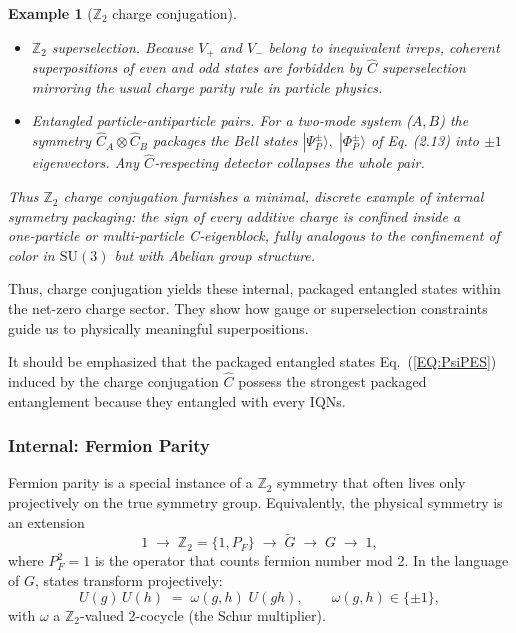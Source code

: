 \documentclass[12pt,a4paper]{article}
\newtheorem{example}{Example}
\begin{document}
\begin{example}[$\mathbb Z_{2}$ charge conjugation]
\begin{enumerate}
\begin{itemize}
			\item $\mathbb Z_{2}$ superselection.
			Because $V_{+}$ and $V_{-}$ belong to inequivalent irreps,
			coherent superpositions of even and odd states are forbidden by
			$\hat C$ superselection mirroring the usual charge parity rule in particle physics.
			
			\item Entangled particle-antiparticle pairs.
			For a two‑mode system ($A,B$) the symmetry
			$\hat C_A\otimes\hat C_B$ packages the Bell states
			$
			|\Psi_P^\pm\rangle,\;
			|\Phi_P^\pm\rangle
			$
			of Eq. (2.13) into $\pm1$ eigenvectors.
			Any $\hat C$‑respecting	detector collapses the whole pair.
		\end{itemize}
	\end{enumerate}
	
	
	Thus $\mathbb Z_{2}$ charge conjugation furnishes a minimal, discrete example	of internal symmetry packaging: the sign of every additive charge is confined inside a one‑particle or multi‑particle C‑eigenblock, fully analogous to the confinement of color in $\mathrm{SU}(3)$ but with Abelian group structure.
\end{example}



Thus, charge conjugation yields these internal, packaged entangled states within the net-zero charge sector.
They show how gauge or superselection constraints guide us to physically meaningful superpositions.


It should be emphasized that the packaged entangled states Eq.~(\ref{EQ:PsiPES}) induced by the charge conjugation $\hat{C}$ possess the strongest packaged entanglement because they entangled with every IQNs.



\subsubsection{Internal: Fermion Parity}
\label{SEC:Z2FermionParity}

Fermion parity is a special instance of a $\mathbb Z_2$ symmetry that often lives only projectively on the true symmetry group.
Equivalently, the physical symmetry is an extension
\[
1 \;\longrightarrow\;\mathbb Z_2=\{1,P_F\}
\;\longrightarrow\;
\widetilde G
\;\longrightarrow\;
G
\;\longrightarrow\;
1,
\]
where $P_F^2=1$ is the operator that counts fermion number mod 2.
In the language of $G$, states transform projectively:
\[
U(g)\,U(h)
\;=\;\omega(g,h)\;U(gh), 
\qquad
\omega(g,h)\in\{\pm1\},
\]
with $\omega$ a $\mathbb Z_2$-valued 2-cocycle (the Schur multiplier).
\end{document}
